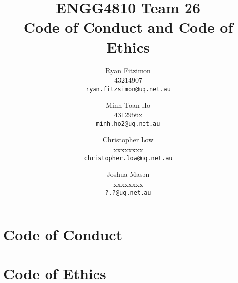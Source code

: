 \documentclass[a4paper]{article}
\title{ENGG4810 Team 26\\
	Code of Conduct and Code of Ethics}
\author{
	Ryan Fitzimon\\
	43214907\\
	\texttt{ryan.fitzsimon@uq.net.au}
	\and
	Minh Toan Ho\\
	4312956x\\
	\texttt{minh.ho2@uq.net.au}
	\and
	Christopher Low\\
	xxxxxxxx\\
	\texttt{christopher.low@uq.net.au}
	\and
	Joshua Mason\\
	xxxxxxxx\\
	\texttt{?.?@uq.net.au}
}
\begin{document}
\maketitle

\section{Code of Conduct}

\section{Code of Ethics}
\end{document}
